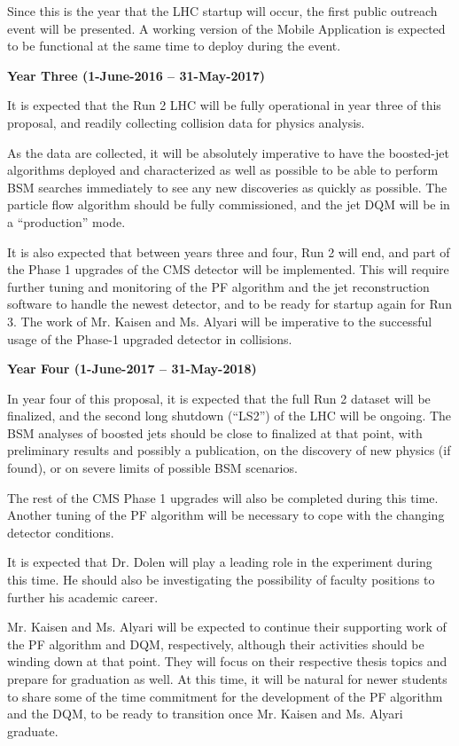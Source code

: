\documentclass[12pt]{proposalnsf}
\begin{document}
Since this is the year that the LHC startup will occur, 
the first public outreach event will be presented. A working version
of the Mobile Application is expected to be functional at the same
time to deploy during the event. 

\bigskip
\bigskip
{\bf \Large Year Three (1-June-2016 -- 31-May-2017)}
\bigskip


It is expected that the Run 2 LHC will be fully
operational in year three of this proposal, and readily collecting
collision data for physics analysis. 

As the data are collected, it will be absolutely imperative to have
the boosted-jet algorithms deployed and characterized as well as
possible to be able to perform BSM searches immediately to see any new
discoveries as quickly as possible. The particle flow algorithm should
be fully commissioned, and the jet DQM will be in a ``production''
mode. 

It is also expected that between years three and four, Run 2
will end, and part of the Phase 1 upgrades of the CMS detector will be
implemented. This will require further tuning and monitoring of the PF
algorithm and the jet reconstruction software to handle the newest
detector, and to be ready for startup again for Run 3. The work of
Mr. Kaisen and Ms. Alyari will be imperative to the successful usage
of the Phase-1 upgraded detector in collisions. 

\bigskip
\bigskip
{\bf \Large Year Four (1-June-2017 -- 31-May-2018)}
\bigskip

In year four of this proposal, it is expected that the full Run 2
dataset will be finalized, and the second long shutdown (``LS2'') of
the LHC will be ongoing. The BSM analyses of boosted
jets should be close to finalized at that point, with preliminary results
and possibly a publication, on the discovery of new physics (if
found), or on severe limits of possible BSM scenarios. 

The rest of the CMS Phase 1 upgrades will also be completed during
this time. Another tuning of the PF algorithm will be necessary to
cope with the changing detector conditions. 

It is expected that Dr. Dolen will play a leading role in the
experiment during this time. He should also be investigating the
possibility of faculty positions to further his academic career. 

Mr. Kaisen and Ms. Alyari will be expected to continue their
supporting work of the PF algorithm and DQM, respectively, although
their activities should be winding down at that point. They will
focus on their respective thesis topics and prepare for graduation as
well. At this time, it will be natural for newer students to share
some of the time commitment for the development of the PF algorithm
and the DQM, to be ready to transition once Mr. Kaisen and Ms. Alyari
graduate. 
\end{document}
